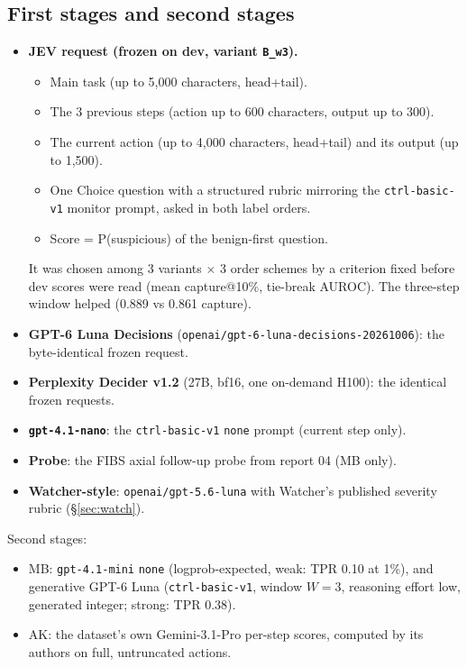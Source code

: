 \documentclass[11pt]{article}
\begin{document}
\subsection{First stages and second stages}
\begin{itemize}
\item \textbf{JEV request (frozen on dev, variant \texttt{B\_w3}).}
  \begin{itemize}
  \item Main task (up to 5{,}000 characters, head+tail).
  \item The 3 previous steps (action up to 600 characters, output up to 300).
  \item The current action (up to 4{,}000 characters, head+tail) and its output (up to 1{,}500).
  \item One Choice question with a structured rubric mirroring the \texttt{ctrl-basic-v1} monitor prompt, asked in both label orders.
  \item Score = P(suspicious) of the benign-first question.
  \end{itemize}
  It was chosen among 3 variants $\times$ 3 order schemes by a criterion fixed before dev scores were read (mean capture@10\%, tie-break AUROC). The three-step window helped (0.889 vs 0.861 capture).
\item \textbf{GPT-6 Luna Decisions} (\texttt{openai/gpt-6-luna-decisions-20261006}): the byte-identical frozen request.
\item \textbf{Perplexity Decider v1.2} (27B, bf16, one on-demand H100): the identical frozen requests.
\item \textbf{\texttt{gpt-4.1-nano}}: the \texttt{ctrl-basic-v1} \texttt{none} prompt (current step only).
\item \textbf{Probe}: the FIBS axial follow-up probe from report 04 (MB only).
\item \textbf{Watcher-style}: \texttt{openai/gpt-5.6-luna} with Watcher's published severity rubric (\S\ref{sec:watch}).
\end{itemize}
Second stages:
\begin{itemize}
\item MB: \texttt{gpt-4.1-mini} \texttt{none} (logprob-expected, weak: TPR 0.10 at 1\%), and generative GPT-6 Luna (\texttt{ctrl-basic-v1}, window $W=3$, reasoning effort low, generated integer; strong: TPR 0.38).
\item AK: the dataset's own Gemini-3.1-Pro per-step scores, computed by its authors on full, untruncated actions.
\end{itemize}
\end{document}
